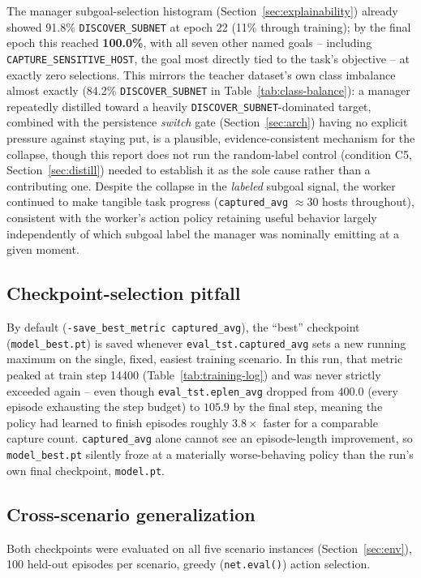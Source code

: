 \documentclass[11pt]{article}
\newcommand{\code}[1]{\texttt{#1}}
\begin{document}
The manager subgoal-selection histogram (Section~\ref{sec:explainability}) already
showed 91.8\% \code{DISCOVER\_SUBNET} at epoch 22 (11\% through training); by the
final epoch this reached \textbf{100.0\%}, with all seven other named goals --
including \code{CAPTURE\_SENSITIVE\_HOST}, the goal most directly tied to the task's
objective -- at exactly zero selections. This mirrors the teacher dataset's own class
imbalance almost exactly (84.2\% \code{DISCOVER\_SUBNET} in Table~\ref{tab:class-balance}):
a manager repeatedly distilled toward a heavily \code{DISCOVER\_SUBNET}-dominated
target, combined with the persistence \emph{switch} gate (Section~\ref{sec:arch})
having no explicit pressure against staying put, is a plausible, evidence-consistent
mechanism for the collapse, though this report does not run the random-label control
(condition C5, Section~\ref{sec:distill}) needed to establish it as the sole cause
rather than a contributing one. Despite the collapse in the \emph{labeled} subgoal
signal, the worker continued to make tangible task progress (\code{captured\_avg}
$\approx 30$ hosts throughout), consistent with the worker's action policy retaining
useful behavior largely independently of which subgoal label the manager was
nominally emitting at a given moment.

\subsection{Checkpoint-selection pitfall}
By default (\code{-save\_best\_metric captured\_avg}), the ``best'' checkpoint
(\code{model\_best.pt}) is saved whenever \code{eval\_tst.captured\_avg} sets a new
running maximum on the single, fixed, easiest training scenario. In this run, that
metric peaked at train step 14400 (Table~\ref{tab:training-log}) and was never
strictly exceeded again -- even though \code{eval\_tst.eplen\_avg} dropped from
$400.0$ (every episode exhausting the step budget) to $105.9$ by the final step,
meaning the policy had learned to finish episodes roughly $3.8\times$ faster for a
comparable capture count. \code{captured\_avg} alone cannot see an episode-length
improvement, so \code{model\_best.pt} silently froze at a materially worse-behaving
policy than the run's own final checkpoint, \code{model.pt}.

\subsection{Cross-scenario generalization}
Both checkpoints were evaluated on all five scenario instances
(Section~\ref{sec:env}), 100 held-out episodes per scenario, greedy (\code{net.eval()})
action selection.
\end{document}
